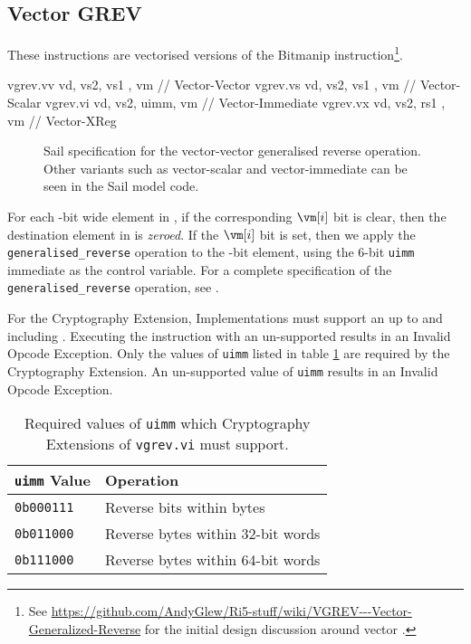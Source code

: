 \clearpage
\subsection{Vector GREV}

These instructions are vectorised versions of the Bitmanip
 instruction\footnote{
See \url{https://github.com/AndyGlew/Ri5-stuff/wiki/VGREV---Vector-Generalized-Reverse}
for the initial design discussion around vector .
}.

\begin{cryptoisa}
vgrev.vv     vd, vs2, vs1 , vm  // Vector-Vector
vgrev.vs     vd, vs2, vs1 , vm  // Vector-Scalar
vgrev.vi     vd, vs2, uimm, vm  // Vector-Immediate
vgrev.vx     vd, vs2, rs1 , vm  // Vector-XReg
\end{cryptoisa}

\begin{figure}[h]

\caption{
Sail specification for the vector-vector generalised reverse operation.
Other variants such as vector-scalar and vector-immediate can be seen in
the Sail model code.
}
\label{fig:sail:vgrev}
\end{figure}

For each \EEW-bit wide element in , if the corresponding $\vm[i]$
bit is clear, then the destination element in \vrd is {\em zeroed}.
If the $\vm[i]$ bit is set, then we apply the
\texttt{generalised\_reverse} operation to the \EEW-bit element, using the
$6$-bit \texttt{uimm} immediate as the control variable.
For a complete specification of the \texttt{generalised\_reverse}
operation, see 
\cite[Section 2.2.2, Generalized Reverse]{riscv:bitmanip:draft}.

For the Cryptography Extension,
Implementations must support an \EEW up to and including \XLEN.
Executing the instruction with an un-supported \EEW results in an
Invalid Opcode Exception.
Only the values of \texttt{uimm} listed in table \ref{tab:vgrev:uimm}
are required by the Cryptography Extension.
An un-supported value of \texttt{uimm} results in an
Invalid Opcode Exception.

\begin{table}
\centering
\begin{tabular}{ll}
\texttt{uimm} Value & Operation                         \\
\hline
\texttt{0b000111}   & Reverse bits within bytes         \\
\texttt{0b011000}   & Reverse bytes within 32-bit words \\
\texttt{0b111000}   & Reverse bytes within 64-bit words \\
\hline
\end{tabular}
\caption{Required values of \texttt{uimm} which Cryptography Extensions
of \texttt{vgrev.vi} must support.}
\label{tab:vgrev:uimm}
\end{table}
